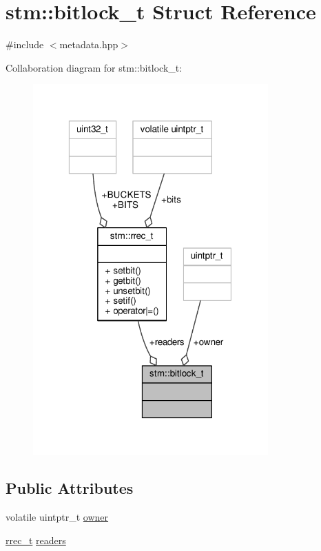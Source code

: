 \hypertarget{structstm_1_1bitlock__t}{\section{stm\-:\-:bitlock\-\_\-t Struct Reference}
\label{structstm_1_1bitlock__t}
}


{\ttfamily \#include $<$metadata.\-hpp$>$}



Collaboration diagram for stm\-:\-:bitlock\-\_\-t\-:
\nopagebreak
\begin{figure}[H]
\begin{center}
\leavevmode
\includegraphics[width=256pt]{structstm_1_1bitlock__t__coll__graph}
\end{center}
\end{figure}
\subsection*{Public Attributes}
\begin{DoxyCompactItemize}
\item 
volatile uintptr\-\_\-t \hyperlink{structstm_1_1bitlock__t_a9998628fab8ea8149e6e3b257cee4c9e}{owner}
\item 
\hyperlink{structstm_1_1rrec__t}{rrec\-\_\-t} \hyperlink{structstm_1_1bitlock__t_ae76a58d0e8960026d49917e1e8f901e8}{readers}
\end{DoxyCompactItemize}


